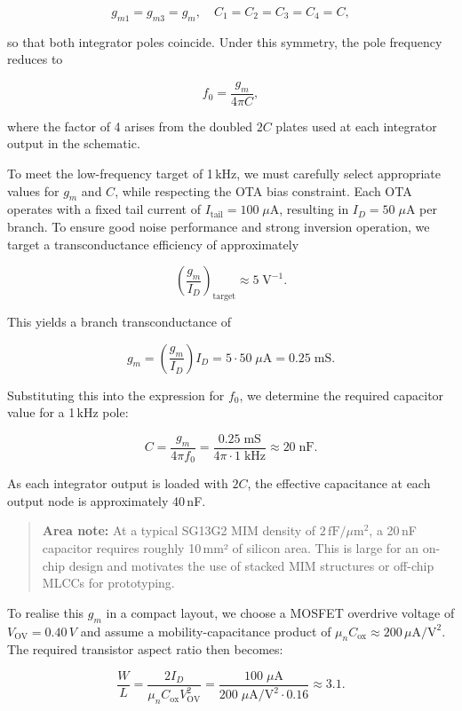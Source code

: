 \documentclass[
  letterpaper,
]{scrbook}
\begin{document}
\[
g_{m1} = g_{m3} = g_m, \quad C_1 = C_2 = C_3 = C_4 = C,
\]

so that both integrator poles coincide. Under this symmetry, the pole
frequency reduces to

\[
f_0 = \frac{g_m}{4\pi C},
\]

where the factor of 4 arises from the doubled \(2C\) plates used at each
integrator output in the schematic.

To meet the low-frequency target of 1\,kHz, we must carefully select
appropriate values for \(g_m\) and \(C\), while respecting the OTA bias
constraint. Each OTA operates with a fixed tail current of
\(I_{\text{tail}} = 100\;\mu\text{A}\), resulting in
\(I_D = 50\;\mu\text{A}\) per branch. To ensure good noise performance
and strong inversion operation, we target a transconductance efficiency
of approximately

\[
\left( \frac{g_m}{I_D} \right)_{\text{target}} \approx 5\;\text{V}^{-1}.
\]

This yields a branch transconductance of

\[
g_m = \left(\frac{g_m}{I_D}\right) I_D = 5 \cdot 50\;\mu\text{A} = 0.25\;\text{mS}.
\]

Substituting this into the expression for \(f_0\), we determine the
required capacitor value for a 1\,kHz pole:

\[
C = \frac{g_m}{4\pi f_0} = \frac{0.25\;\text{mS}}{4\pi \cdot 1\;\text{kHz}} \approx 20\;\text{nF}.
\]

As each integrator output is loaded with \(2C\), the effective
capacitance at each output node is approximately 40\,nF.

\begin{quote}
\textbf{Area note:} At a typical SG13G2 MIM density of
\(2\,\text{fF}/\mu\text{m}^2\), a 20\,nF capacitor requires roughly
10\,mm² of silicon area. This is large for an on-chip design and
motivates the use of stacked MIM structures or off-chip MLCCs for
prototyping.
\end{quote}

To realise this \(g_m\) in a compact layout, we choose a MOSFET
overdrive voltage of \(V_{\text{OV}} = 0.40\,V\) and assume a
mobility-capacitance product of
\(\mu_n C_{\text{ox}} \approx 200\,\mu\text{A}/\text{V}^2\). The
required transistor aspect ratio then becomes:

\[
\frac{W}{L} = \frac{2I_D}{\mu_n C_{\text{ox}} V_{\text{OV}}^2}
= \frac{100\;\mu\text{A}}{200\;\mu\text{A}/\text{V}^2 \cdot 0.16} \approx 3.1.
\]
\end{document}

